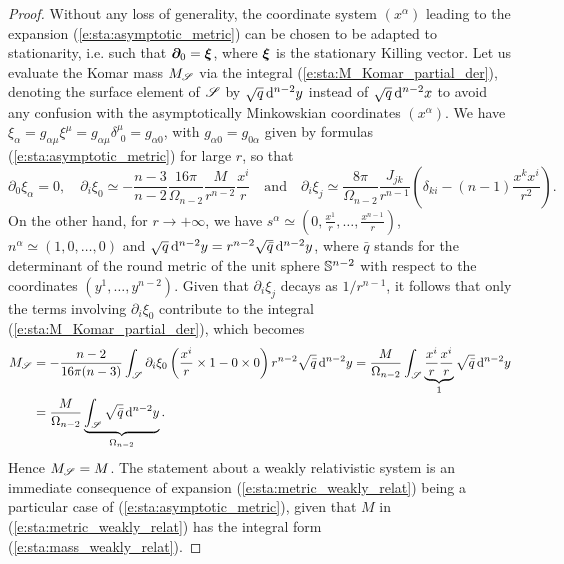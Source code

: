\begin{proof}
Without any loss of generality, the coordinate system $(x^\alpha)$ leading
to the expansion (\ref{e:sta:asymptotic_metric}) can be chosen to be adapted
to stationarity, i.e. such that  $\bm{\partial}_0 = \bm{\xi}$, where $\bm{\xi}$ is the
stationary Killing vector.
Let us evaluate the Komar mass $M_{\mathscr{S}}$
via the integral (\ref{e:sta:M_Komar_partial_der}),
denoting the surface element of $\mathscr{S}$ by $\sqrt{q} \, \mathrm{d}^{n-2} y$
instead of $\sqrt{q} \, \mathrm{d}^{n-2} x$  to avoid any
confusion with the asymptotically Minkowskian coordinates $(x^\alpha)$.
We have $\xi_\alpha = g_{\alpha\mu} \xi^\mu = g_{\alpha\mu} \delta^\mu_{\ \, 0} =  g_{\alpha 0}$,
with $g_{\alpha 0} = g_{0\alpha}$ given by formulas (\ref{e:sta:asymptotic_metric}) for large $r$,
so that
\[
    \partial_0 \xi_\alpha = 0, \quad
    \partial_i \xi_0 \simeq - \frac{n-3}{n-2} \frac{16\pi}{\Omega_{n-2}} \frac{M}{r^{n-2}} \frac{x^i}{r}
    \quad \mbox{and} \quad
    \partial_i \xi_j \simeq \frac{8\pi}{\Omega_{n-2}} \frac{J_{jk}}{r^{n-1}}
    \left( \delta_{ki} - (n-1) \frac{x^k x^i}{r^2} \right) .
\]
On the other hand, for $r\to +\infty$, we have
$s^\alpha \simeq \left(0,\frac{x^1}{r}, \ldots,\frac{x^{n-1}}{r} \right)$,
$n^\alpha \simeq (1, 0, \ldots, 0)$ and $\sqrt{q} \, \mathrm{d}^{n-2}y = r^{n-2} \sqrt{\bar{q}} \, \mathrm{d}^{n-2} y$,
where $\bar{q}$ stands for the determinant of the round metric of the unit sphere $\mathbb{S}^{n-2}$ with
respect to the coordinates $(y^1,\ldots,y^{n-2})$. Given that $\partial_i \xi_j$ decays as $1/r^{n-1}$,
it follows that only the terms
involving $\partial_i \xi_0$ contribute to the integral (\ref{e:sta:M_Komar_partial_der}), which becomes
\begin{align}
    M_{\mathscr{S}} & = -\frac{n-2}{16\pi(n-3)}
    \int_{\mathscr{S}} \partial_i \xi_0 \left( \frac{x^i}{r} \times 1 - 0\times 0 \right) r^{n-2} \sqrt{\bar{q}} \, \mathrm{d}^{n-2} y
    = \frac{M}{\Omega_{n-2}} \int_{\mathscr{S}} \underbrace{\frac{x^i}{r} \frac{x^i}{r}}_{1}
     \sqrt{\bar{q}} \, \mathrm{d}^{n-2} y \nonumber \\
     & = \frac{M}{\Omega_{n-2}} \underbrace{ \int_{\mathscr{S}} \sqrt{\bar{q}} \, \mathrm{d}^{n-2} y }_{\Omega_{n-2}} .
       \nonumber
\end{align}
Hence $M_{\mathscr{S}} = M$. The statement about a weakly relativistic system is an immediate consequence
of expansion (\ref{e:sta:metric_weakly_relat}) being a particular case of
(\ref{e:sta:asymptotic_metric}), given that $M$ in (\ref{e:sta:metric_weakly_relat}) has
the integral form (\ref{e:sta:mass_weakly_relat}).
\end{proof}


